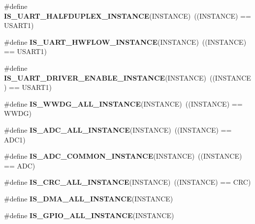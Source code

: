 \begin{DoxyCompactItemize}
\#define {\bfseries I\+S\+\_\+\+U\+A\+R\+T\+\_\+\+H\+A\+L\+F\+D\+U\+P\+L\+E\+X\+\_\+\+I\+N\+S\+T\+A\+N\+CE}(I\+N\+S\+T\+A\+N\+CE)~((I\+N\+S\+T\+A\+N\+CE) == U\+S\+A\+R\+T1)
\item 
\mbox{\label{group___exported__macro_gaf9a11d0720f3efa780126414a4ac50ad}} 
\#define {\bfseries I\+S\+\_\+\+U\+A\+R\+T\+\_\+\+H\+W\+F\+L\+O\+W\+\_\+\+I\+N\+S\+T\+A\+N\+CE}(I\+N\+S\+T\+A\+N\+CE)~((I\+N\+S\+T\+A\+N\+CE) == U\+S\+A\+R\+T1)
\item 
\mbox{\label{group___exported__macro_ga98f122ffe4d77f03a13f682301e2d596}} 
\#define {\bfseries I\+S\+\_\+\+U\+A\+R\+T\+\_\+\+D\+R\+I\+V\+E\+R\+\_\+\+E\+N\+A\+B\+L\+E\+\_\+\+I\+N\+S\+T\+A\+N\+CE}(I\+N\+S\+T\+A\+N\+CE)~((I\+N\+S\+T\+A\+N\+CE) == U\+S\+A\+R\+T1)
\item 
\mbox{\label{group___exported__macro_gac2a8aaec233e19987232455643a04d6f}} 
\#define {\bfseries I\+S\+\_\+\+W\+W\+D\+G\+\_\+\+A\+L\+L\+\_\+\+I\+N\+S\+T\+A\+N\+CE}(I\+N\+S\+T\+A\+N\+CE)~((I\+N\+S\+T\+A\+N\+CE) == W\+W\+DG)
\item 
\mbox{\label{group___exported__macro_ga2204b62b378bcf08b3b9006c184c7c23}} 
\#define {\bfseries I\+S\+\_\+\+A\+D\+C\+\_\+\+A\+L\+L\+\_\+\+I\+N\+S\+T\+A\+N\+CE}(I\+N\+S\+T\+A\+N\+CE)~((I\+N\+S\+T\+A\+N\+CE) == A\+D\+C1)
\item 
\mbox{\label{group___exported__macro_gad8a5831c786b6b265531b890a194cbe2}} 
\#define {\bfseries I\+S\+\_\+\+A\+D\+C\+\_\+\+C\+O\+M\+M\+O\+N\+\_\+\+I\+N\+S\+T\+A\+N\+CE}(I\+N\+S\+T\+A\+N\+CE)~((I\+N\+S\+T\+A\+N\+CE) == A\+DC)
\item 
\mbox{\label{group___exported__macro_gaa514941a7f02f65eb27450c05e4e8dd1}} 
\#define {\bfseries I\+S\+\_\+\+C\+R\+C\+\_\+\+A\+L\+L\+\_\+\+I\+N\+S\+T\+A\+N\+CE}(I\+N\+S\+T\+A\+N\+CE)~((I\+N\+S\+T\+A\+N\+CE) == C\+RC)
\item 
\#define {\bfseries I\+S\+\_\+\+D\+M\+A\+\_\+\+A\+L\+L\+\_\+\+I\+N\+S\+T\+A\+N\+CE}(I\+N\+S\+T\+A\+N\+CE)
\item 
\#define {\bfseries I\+S\+\_\+\+G\+P\+I\+O\+\_\+\+A\+L\+L\+\_\+\+I\+N\+S\+T\+A\+N\+CE}(I\+N\+S\+T\+A\+N\+CE)
\item 

\end{DoxyCompactItemize}
